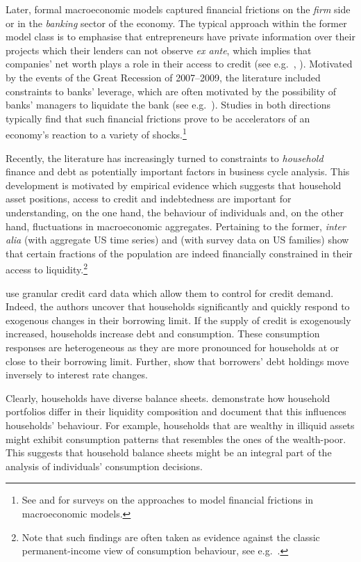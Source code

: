 \documentclass[12pt]{article} %
\numberwithin{equation}{section} %
\numberwithin{figure}{section}
\numberwithin{table}{section}
\begin{document}
Later, formal macroeconomic models captured financial frictions on the \textit{firm} side or in the \textit{banking} sector of the economy. The typical approach within the former model class is to emphasise that entrepreneurs have private information over their projects which their lenders can not observe \textit{ex ante}, which implies that companies' net worth plays a role in their access to credit (see e.g.~\cite{bg1989}, \cite{bgg1999}). Motivated by the events of the Great Recession of 2007--2009, the literature included constraints to banks' leverage, which are often motivated by the possibility of banks' managers to liquidate the bank (see e.g.~\cite{gertler2011}). Studies in both directions typically find that such financial frictions prove to be accelerators of an economy's reaction to a variety of shocks.\footnote{See \textcite{brunnermeier2012} and \textcite{christiano2022} for surveys on the approaches to model financial frictions in macroeconomic models.}

Recently, the literature has increasingly turned to constraints to \textit{household} finance and debt as potentially important factors in business cycle analysis. This development is motivated by empirical evidence which suggests that household asset positions, access to credit and indebtedness are important for understanding, on the one hand, the behaviour of individuals and, on the other hand, fluctuations in macroeconomic aggregates. Pertaining to the former, \textit{inter alia} \textcite{campbell1989} (with aggregate US time series) and \textcite{zeldes1989} (with survey data on US families) show that certain fractions of the population are indeed financially constrained in their access to liquidity.\footnote{Note that such findings are often taken as evidence against the classic permanent-income view of consumption behaviour, see e.g.~\textcite{kaplan2014}.}

\textcite{gross2002} use granular credit card data which allow them to control for credit demand. Indeed, the authors uncover that households significantly and quickly respond to exogenous changes in their borrowing limit. If the supply of credit is exogenously increased, households increase debt and consumption. These consumption responses are heterogeneous as they are more pronounced for households at or close to their borrowing limit. Further, \textcite{gross2002} show that borrowers' debt holdings move inversely to interest rate changes.

Clearly, households have diverse balance sheets. \textcite{kaplan2014} demonstrate how household portfolios differ in their liquidity composition and document that this influences households' behaviour. For example, households that are wealthy in illiquid assets might exhibit consumption patterns that resembles the ones of the wealth-poor. This suggests that household balance sheets might be an integral part of the analysis of individuals' consumption decisions.
\end{document}
